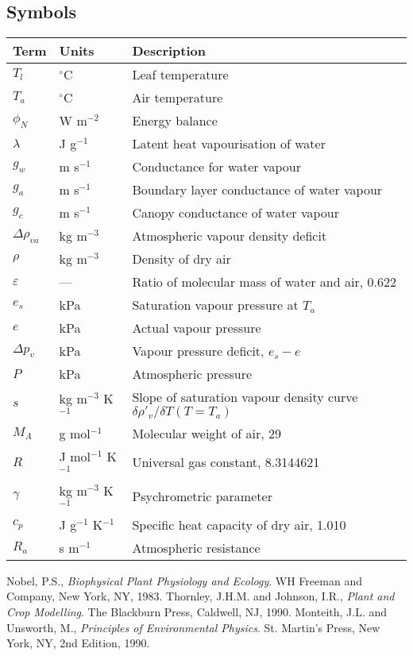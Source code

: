 \documentclass[a4paper]{article}
\begin{document}
\subsection{Symbols}
\begin{tabularx}{\textwidth}{l | l | X}
Term & Units & Description \\
\hline
$T_l$ & $^{\circ}$C & Leaf temperature \\
$T_a$ & $^{\circ}$C & Air temperature \\
$\phi_N$ & W m$^{-2}$ & Energy balance \\
$\lambda$ & J g$^{-1}$ & Latent heat vapourisation of water \\
$g_w$ & m s$^{-1}$ & Conductance for water vapour \\
$g_a$ & m s$^{-1}$ & Boundary layer conductance of water vapour \\
$g_c$ & m s$^{-1}$ & Canopy conductance of water vapour \\
$\Delta \rho_{va}$ & kg m$^{-3}$ & Atmospheric vapour density deficit \\
$\rho$ & kg m$^{-3}$ & Density of dry air \\
$\varepsilon$ & --- & Ratio of molecular mass of water and air, 0.622 \\
$e_s$ & kPa & Saturation vapour pressure at $T_a$\\
$e$ & kPa & Actual vapour pressure \\
$\Delta p_v$ & kPa & Vapour pressure deficit, $e_s - e$ \\
$P$ & kPa & Atmospheric pressure \\
$s$ & kg m$^{-3}$ K$^{-1}$ & Slope of saturation vapour density curve $\delta \rho'_v / \delta T (T 
= T_a)$ \\
$M_A$ & g mol$^{-1}$ & Molecular weight of air, 29 \\
$R$ & J mol$^{-1}$ K$^{-1}$ & Universal gas constant, 8.3144621 \\
$\gamma$ & kg m$^{-3}$ K$^{-1}$ & Psychrometric parameter \\
$c_p$ & J g$^{-1}$ K$^{-1}$ & Specific heat capacity of dry air, 1.010 \\
$R_a$ & s m$^{-1}$ & Atmospheric resistance \\
\end{tabularx}

\begin{thebibliography}{}
    Nobel, P.S.,
    \emph{Biophysical Plant Physiology and Ecology}.
    WH Freeman and Company, New York, NY, 1983.
    Thornley, J.H.M. and Johnson, I.R.,
    \emph{Plant and Crop Modelling}.
    The Blackburn Press, Caldwell, NJ, 1990.
    Monteith, J.L. and Unsworth, M.,
    \emph{Principles of Environmental Physics}.
    St. Martin's Press, New York, NY, 2nd Edition, 1990.
\end{thebibliography}
\end{document}
